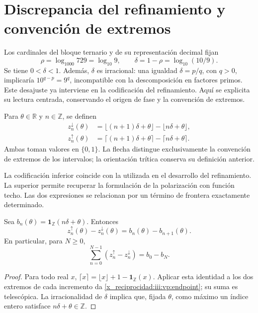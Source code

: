 \section{Discrepancia del refinamiento y convención de extremos}

Los cardinales del bloque ternario y de su representación decimal fijan
\[
 \rho=\log_{1000}729=\log_{10}9,\qquad
 \delta=1-\rho=\log_{10}(10/9).
\]
Se tiene $0<\delta<1$. Además, $\delta$ es irracional: una igualdad
$\delta=p/q$, con $q>0$, implicaría $10^{q-p}=9^q$, incompatible con
la descomposición en factores primos. Este desajuste ya interviene en la
codificación del refinamiento. Aquí se explicita su lectura centrada,
conservando el origen de fase y la convención de extremos.

\begin{definition}
Para $\theta\in\mathbb R$ y $n\in\mathbb Z$, se definen
\begin{align}
 z_n^{\downarrow}(\theta)
 &=\lfloor(n+1)\delta+\theta\rfloor-\lfloor n\delta+\theta\rfloor,
 \label{x_reciprocidad:iii:vp:lower}\\
 z_n^{\uparrow}(\theta)
 &=\lceil(n+1)\delta+\theta\rceil-\lceil n\delta+\theta\rceil.
 \label{x_reciprocidad:iii:vp:upper}
\end{align}
Ambas toman valores en $\{0,1\}$. La flecha distingue exclusivamente la
convención de extremos de los intervalos; la orientación trítica conserva
su definición anterior.
\end{definition}

La codificación inferior coincide con la utilizada en el desarrollo
del refinamiento. La superior permite recuperar la formulación de la
polarización con función techo. Las dos expresiones se relacionan por
un término de frontera exactamente determinado.

\begin{proposition}
Sea $b_n(\theta)=\mathbf1_{\mathbb Z}(n\delta+\theta)$. Entonces
\begin{equation}
 z_n^{\uparrow}(\theta)-z_n^{\downarrow}(\theta)
 =b_n(\theta)-b_{n+1}(\theta).
 \label{x_reciprocidad:iii:vp:endpoint}
\end{equation}
En particular, para $N\geq0$,
\[
 \sum_{n=0}^{N-1}(z_n^{\uparrow}-z_n^{\downarrow})
 =b_0-b_N.
\]
\end{proposition}
\begin{proof}
Para todo real $x$, $\lceil x\rceil=\lfloor x\rfloor+1-
\mathbf1_{\mathbb Z}(x)$. Aplicar esta identidad a los dos extremos
de cada incremento da \eqref{x_reciprocidad:iii:vp:endpoint}; su suma es telescópica.
La irracionalidad de $\delta$ implica que, fijada $\theta$, como máximo
un índice entero satisface $n\delta+\theta\in\mathbb Z$.
\end{proof}

